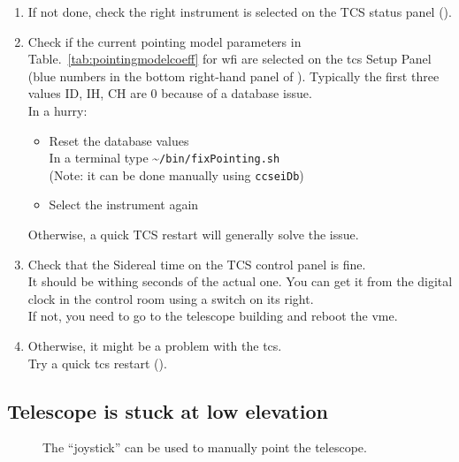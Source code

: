 \documentclass[11pt,fleqn,a4paper]{book}
\begin{document}
\begin{enumerate}   
    \item If not done, check the right instrument is selected on the \gls{TCS status panel}
        ().
    \item Check if the current \gls{pointing model} parameters in Table.~\ref{tab:pointingmodelcoeff} for \gls{wfi} are selected on the \gls{tcs} Setup Panel (blue numbers in the bottom right-hand panel of ). Typically
        the first three values ID, IH, CH are 0 because of a database issue.\\
        In a hurry:
        \begin{itemize}
            \item Reset the database values\\
                  In a terminal type \~{}\texttt{/bin/fixPointing.sh}\\
                  (Note: it can be done manually using \texttt{ccseiDb})
            \item Select the instrument again
        \end{itemize}
        Otherwise, a quick TCS restart will generally solve the issue.
    \item Check that the Sidereal time on the \gls{TCS control panel} is fine.\\
      It should be withing seconds of the actual one.  You can get it from
      the digital clock in the \gls{control room} using a switch on its right.\\
      If not, you need to go to the telescope building and reboot the \gls{vme}.
    \item Otherwise, it might be a problem with the \gls{tcs}.\\ 
       Try a quick \gls{tcs} restart ().
\end{enumerate}  

\subsection{Telescope is stuck at low elevation}

\begin{figure}
\centering
{}%
\hspace{0.03\linewidth}%
\caption{The ``joystick'' can be used to manually point the telescope.}
\label{fig:tel-joystick}
\end{figure}
\end{document}
